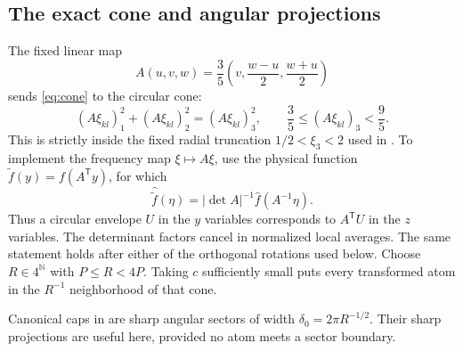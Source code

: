 \documentclass[11pt,reqno]{amsart}
\numberwithin{equation}{section}
\theoremstyle{definition}
\theoremstyle{remark}
\newcommand{\N}{\mathbb N}
\begin{document}
\subsection{The exact cone and angular projections}
The fixed linear map
\[
 A(u,v,w)=\frac35\left(v,\frac{w-u}{2},\frac{w+u}{2}\right)
\]
sends \eqref{eq:cone} to the circular cone:
\[
 (A\xi_{kl})_1^2+(A\xi_{kl})_2^2=(A\xi_{kl})_3^2,
 \qquad \frac35\le(A\xi_{kl})_3<\frac95.
\]
This is strictly inside the fixed radial truncation $1/2<\xi_3<2$ used in \cite[Section~5]{GM}.
To implement the frequency map $\xi\mapsto A\xi$, use the physical function
$\widetilde f(y)=f(A^{\mathsf T}y)$, for which
\[
 \widehat{\widetilde f}(\eta)=|\det A|^{-1}\widehat f(A^{-1}\eta).
\]
Thus a circular envelope $U$ in the $y$ variables corresponds to $A^{\mathsf T}U$ in the $z$ variables. The determinant factors cancel in normalized local averages. The same statement holds after either of the orthogonal rotations used below.
Choose $R\in4^\N$ with $P\le R<4P$.
Taking $c$ sufficiently small puts every transformed atom in the $R^{-1}$ neighborhood of that cone.

Canonical caps in \cite[Section~5]{GM} are sharp angular sectors of width
$\delta_0=2\pi R^{-1/2}$.
Their sharp projections are useful here, provided no atom meets a sector boundary.
\end{document}
